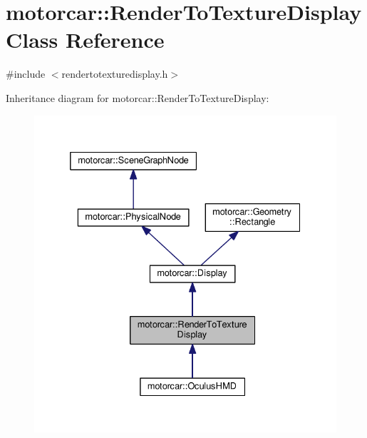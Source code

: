 \hypertarget{classmotorcar_1_1RenderToTextureDisplay}{\section{motorcar\-:\-:Render\-To\-Texture\-Display Class Reference}
\label{classmotorcar_1_1RenderToTextureDisplay}
}


{\ttfamily \#include $<$rendertotexturedisplay.\-h$>$}



Inheritance diagram for motorcar\-:\-:Render\-To\-Texture\-Display\-:
\nopagebreak
\begin{figure}[H]
\begin{center}
\leavevmode
\includegraphics[width=332pt]{classmotorcar_1_1RenderToTextureDisplay__inherit__graph}
\end{center}
\end{figure}


